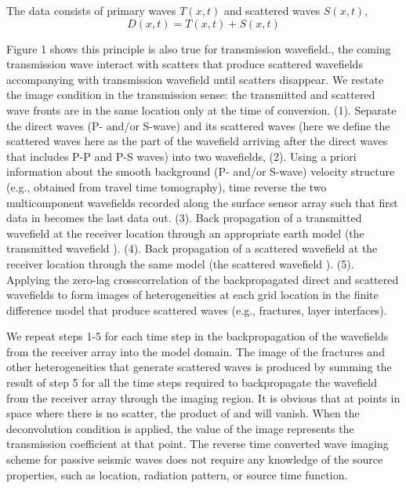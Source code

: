 The data consists of primary waves  $T(x,t)$ and scattered waves $S(x,t)$,
\begin{equation}
\label{eq:eq1}                      
\hspace{0pt} D(x,t) = T(x,t) + S(x,t)
\end{equation}

Figure 1 shows this principle is also true for transmission wavefield., the coming transmission wave interact with scatters that produce scattered wavefields accompanying with transmission wavefield until scatters disappear. We restate the image condition in the transmission sense: the transmitted and scattered wave fronts are in the same location only at the time of conversion. 
 (1). Separate the direct waves (P- and/or S-wave) and its scattered waves (here we define the scattered waves here as the part of the wavefield arriving after the direct waves that includes P-P and P-S waves) into two wavefields, 
(2). Using a priori information about the smooth background (P- and/or S-wave) velocity structure (e.g., obtained from travel time tomography), time reverse the two multicomponent wavefields recorded along the surface sensor array such that first data in becomes the last data out. 
(3). Back propagation of a transmitted wavefield at the receiver   location through an appropriate earth model (the transmitted wavefield  ).
(4). Back propagation of a scattered wavefield at the receiver location   through the same model (the scattered wavefield  ).
(5). Applying the zero-lag crosscorrelation of the backpropagated direct and scattered wavefields to form images of heterogeneities at each grid location in the finite difference model that produce scattered waves (e.g., fractures, layer interfaces).
 
We repeat steps 1-5 for each time step in the backpropagation of the wavefields from the receiver array into the model domain. The image of the fractures and other heterogeneities that generate scattered waves is produced by summing the result of step 5 for all the time steps required to backpropagate the wavefield from the receiver array through the imaging region. It is obvious that at points in space where there is no scatter, the product of   and  will vanish. When the deconvolution condition is applied, the value of the image  represents the transmission coefficient at that point.
The reverse time converted wave imaging scheme for passive seismic waves does not require any knowledge of the source properties, such as location, radiation pattern, or source time function.
 

